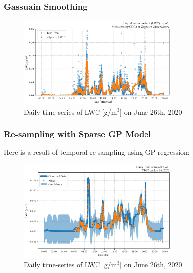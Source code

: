 \documentclass{beamer}
\begin{document}
\begin{frame}
    \frametitle{Gassuain Smoothing}
    \begin{figure}
        \centering
        \includegraphics[width=0.7\textwidth]{img/conv.png}
        \caption{Daily time-series of LWC [g/m$^3$] on June 26th, 2020}
    \end{figure}
\end{frame}

\begin{frame}
    \frametitle{Re-sampling with Sparse GP Model}
    Here is a result of temporal re-sampling using GP regression:

    \begin{figure}
        \centering
        \includegraphics[width=0.7\textwidth]{img/sgp.png}
        \caption{Daily time-series of LWC [g/m$^3$] on June 26th, 2020}
    \end{figure}
\end{frame}
\end{document}
